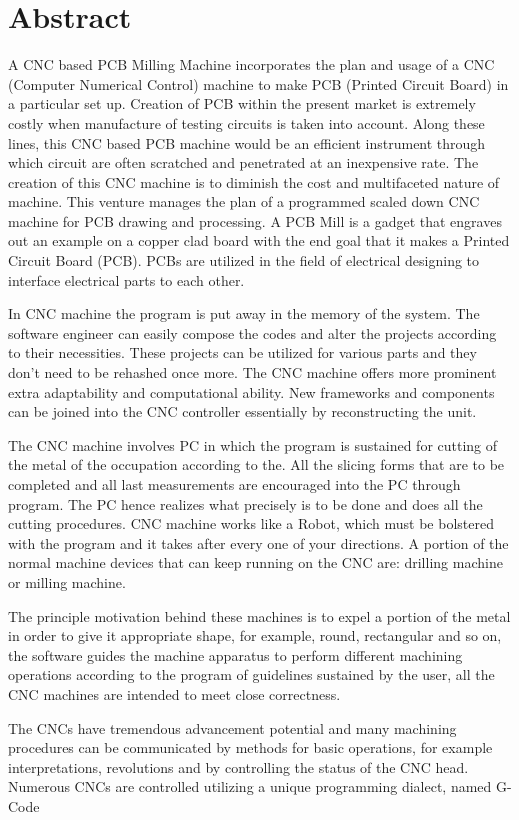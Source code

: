\chapter*{Abstract}

A CNC based PCB Milling Machine incorporates the plan and usage of a CNC (Computer Numerical Control) machine to make PCB (Printed Circuit Board) in a particular set up. Creation of PCB within the present market is extremely costly when manufacture of testing circuits is taken into account. Along these lines, this CNC based PCB machine would be an efficient instrument through which circuit are often scratched and penetrated at an inexpensive rate. The creation of this CNC machine is to diminish the cost and multifaceted nature of machine. This venture manages the plan of a programmed scaled down CNC machine for PCB drawing and processing.
A PCB Mill is a gadget that engraves out an example on a copper clad board with the end goal that it makes a Printed Circuit Board (PCB). PCBs are utilized in the field of electrical designing to interface electrical parts to each other.

In CNC machine the program is put away in the memory of the system. The software engineer can easily compose the codes and alter the projects according to their necessities. These projects can be utilized for various parts and they don’t need to be rehashed once more. The CNC machine offers more prominent extra adaptability and computational ability. New frameworks and components can be joined into the CNC controller essentially by reconstructing the unit.

The CNC machine involves PC in which the program is sustained for cutting of the metal of the occupation according to the. All the slicing forms that are to be completed and all last measurements are encouraged into the PC through program. The PC hence realizes what precisely is to be done and does all the cutting procedures. CNC machine works like a Robot, which must be bolstered with the program and it takes after every one of your directions. A portion of the normal machine devices that can keep running on the CNC are: drilling machine or milling machine.

The principle motivation behind these machines is to expel a portion of the metal in order to give it appropriate shape, for example, round, rectangular and so on, the software guides the machine apparatus to perform different machining operations according to the program of guidelines sustained by the user, all the CNC machines are intended to meet close correctness.

The CNCs have tremendous advancement potential and many machining procedures can be communicated by methods for basic operations, for example interpretations, revolutions and by controlling the status of the CNC head. Numerous CNCs are controlled utilizing a unique programming dialect, named G-Code
